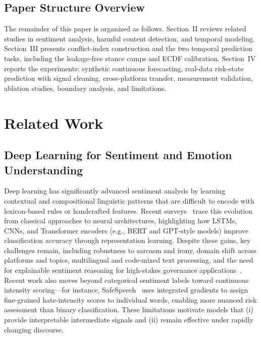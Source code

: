 \documentclass[journal]{IEEEtran}
\begin{document}
\subsection{Paper Structure Overview}
The remainder of this paper is organized as follows. Section~II reviews related studies in sentiment analysis, harmful content detection, and temporal modeling. Section~III presents conflict-index construction and the two temporal prediction tasks, including the leakage-free stance camps and ECDF calibration. Section~IV reports the experiments: synthetic continuous forecasting, real-data risk-state prediction with signal cleaning, cross-platform transfer, measurement validation, ablation studies, boundary analysis, and limitations.

\section{Related Work}

\subsection{Deep Learning for Sentiment and Emotion Understanding}
Deep learning has significantly advanced sentiment analysis by learning contextual and compositional linguistic patterns that are difficult to encode with lexicon-based rules or handcrafted features. Recent surveys~\cite{birjali2021sentiment,wahid2025crisis} trace this evolution from classical approaches to neural architectures, highlighting how LSTMs, CNNs, and Transformer encoders (e.g., BERT and GPT-style models) improve classification accuracy through representation learning. Despite these gains, key challenges remain, including robustness to sarcasm and irony, domain shift across platforms and topics, multilingual and code-mixed text processing, and the need for explainable sentiment reasoning for high-stakes governance applications~\cite{birjali2021sentiment}. Recent work also moves beyond categorical sentiment labels toward continuous intensity scoring---for instance, SafeSpeech~\cite{ghosh2024safespeech} uses integrated gradients to assign fine-grained hate-intensity scores to individual words, enabling more nuanced risk assessment than binary classification. These limitations motivate models that (i) provide interpretable intermediate signals and (ii) remain effective under rapidly changing discourse.
\end{document}
